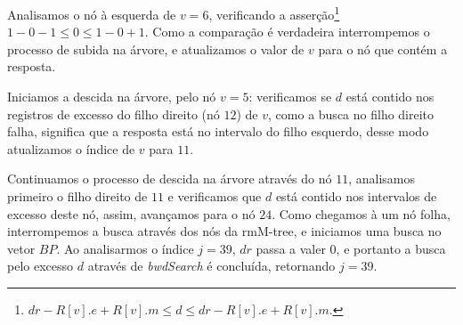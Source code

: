 \begin{example}
        Analisamos o nó à esquerda de $v=6$, verificando a asserção\footnote{$dr - R[v].e + R[v].m \leq d \leq dr - R[v].e + R[v].m$.} $ 1 -0 -1 \leq 0 \leq 1 -0 +1$. Como a comparação é verdadeira interrompemos o processo de subida na árvore, e atualizamos o valor de $v$ para o nó que contém a resposta.
        
        Iniciamos a descida na árvore, pelo nó $v=5$: verificamos se $d$ está contido nos registros de excesso do filho direito (nó $12$) de $v$, como a busca no filho direito falha, significa que a resposta está no intervalo do filho esquerdo, desse modo atualizamos o índice de $v$ para $11$.

        Continuamos o processo de descida na árvore através do nó $11$, analisamos primeiro o filho direito de $11$ e verificamos que $d$ está contido nos intervalos de excesso deste nó, assim, avançamos para o nó $24$. Como chegamos à um nó folha, interrompemos a busca através dos nós da rmM-tree, e iniciamos uma busca no vetor $BP$. Ao analisarmos o índice $j=39$, $dr$ passa a valer $0$, e portanto a busca pelo excesso $d$ através de \textit{bwdSearch} é concluída, retornando $j=39$. 
    \end{example}

